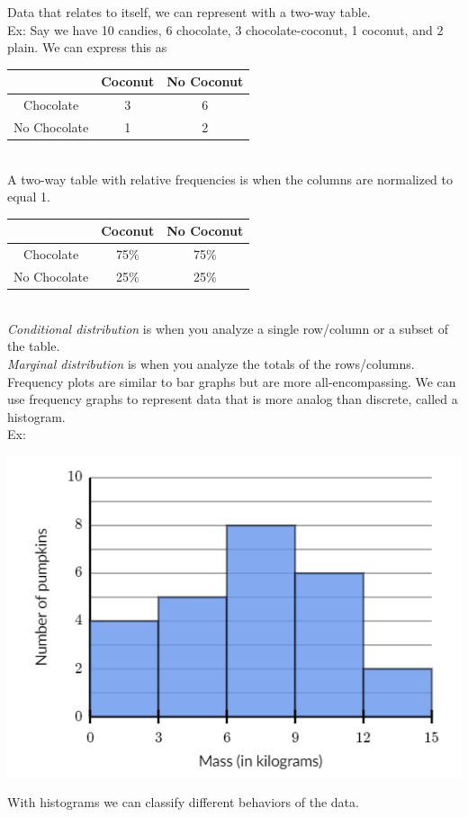 Data that relates to itself, we can represent with a two-way table.\\
Ex: Say we have 10 candies, 6 chocolate, 3 chocolate-coconut, 1 coconut, and 2 plain. We can express this as\\
\begin{tabular}{c|c|c}
    & Coconut & No Coconut\\
    \hline
    Chocolate & 3 & 6\\
    No Chocolate & 1 & 2
\end{tabular}\\
A two-way table with relative frequencies is when the columns are normalized to equal 1.\\
\begin{tabular}{c|c|c}
    & Coconut & No Coconut\\
    \hline
    Chocolate & 75\% & 75\%\\
    No Chocolate & 25\% & 25\%
\end{tabular}\\
\textit{Conditional distribution} is when you analyze a single row/column or a subset of the table.\\
\textit{Marginal distribution} is when you analyze the totals of the rows/columns.\\
Frequency plots are similar to bar graphs but are more all-encompassing. We can use frequency graphs to represent data that is more analog than discrete, called a histogram.\\
Ex:\\
\centerline{\includegraphics[scale=0.7]{Images/FundamentalsPictures/histogram.png}}
With histograms we can classify different behaviors of the data.\\
